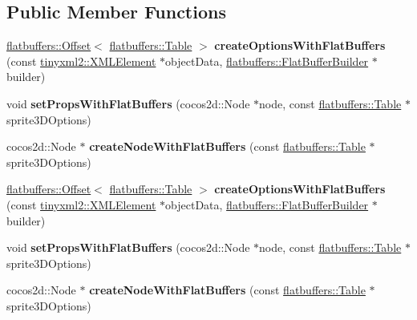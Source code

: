 \subsection*{Public Member Functions}
\begin{DoxyCompactItemize}
\item 
\mbox{\label{classcocostudio_1_1Sprite3DReader_acb474e3fc070d735059070a0370fe300}} 
\hyperlink{structflatbuffers_1_1Offset}{flatbuffers\+::\+Offset}$<$ \hyperlink{classflatbuffers_1_1Table}{flatbuffers\+::\+Table} $>$ {\bfseries create\+Options\+With\+Flat\+Buffers} (const \hyperlink{classtinyxml2_1_1XMLElement}{tinyxml2\+::\+X\+M\+L\+Element} $\ast$object\+Data, \hyperlink{classflatbuffers_1_1FlatBufferBuilder}{flatbuffers\+::\+Flat\+Buffer\+Builder} $\ast$builder)
\item 
\mbox{\label{classcocostudio_1_1Sprite3DReader_a9df850598d8d7431b03d2d98d6cd9193}} 
void {\bfseries set\+Props\+With\+Flat\+Buffers} (cocos2d\+::\+Node $\ast$node, const \hyperlink{classflatbuffers_1_1Table}{flatbuffers\+::\+Table} $\ast$sprite3\+D\+Options)
\item 
\mbox{\label{classcocostudio_1_1Sprite3DReader_ac474196aafebd8a7641266dd5697db88}} 
cocos2d\+::\+Node $\ast$ {\bfseries create\+Node\+With\+Flat\+Buffers} (const \hyperlink{classflatbuffers_1_1Table}{flatbuffers\+::\+Table} $\ast$sprite3\+D\+Options)
\item 
\mbox{\label{classcocostudio_1_1Sprite3DReader_ab2d72677b7a0a11f06e15c12487816d6}} 
\hyperlink{structflatbuffers_1_1Offset}{flatbuffers\+::\+Offset}$<$ \hyperlink{classflatbuffers_1_1Table}{flatbuffers\+::\+Table} $>$ {\bfseries create\+Options\+With\+Flat\+Buffers} (const \hyperlink{classtinyxml2_1_1XMLElement}{tinyxml2\+::\+X\+M\+L\+Element} $\ast$object\+Data, \hyperlink{classflatbuffers_1_1FlatBufferBuilder}{flatbuffers\+::\+Flat\+Buffer\+Builder} $\ast$builder)
\item 
\mbox{\label{classcocostudio_1_1Sprite3DReader_a9df850598d8d7431b03d2d98d6cd9193}} 
void {\bfseries set\+Props\+With\+Flat\+Buffers} (cocos2d\+::\+Node $\ast$node, const \hyperlink{classflatbuffers_1_1Table}{flatbuffers\+::\+Table} $\ast$sprite3\+D\+Options)
\item 
\mbox{\label{classcocostudio_1_1Sprite3DReader_a45534c458af564663fc5ef454feaaeb9}} 
cocos2d\+::\+Node $\ast$ {\bfseries create\+Node\+With\+Flat\+Buffers} (const \hyperlink{classflatbuffers_1_1Table}{flatbuffers\+::\+Table} $\ast$sprite3\+D\+Options)
\end{DoxyCompactItemize}
